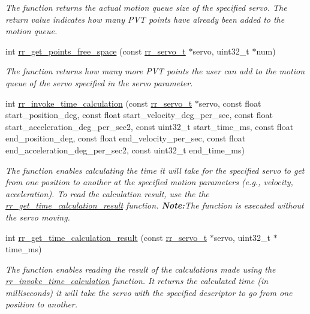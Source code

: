\begin{DoxyCompactItemize}
\begin{DoxyCompactList}\small\item\em The function returns the actual motion queue size of the specified servo. The return value indicates how many P\+VT points have already been added to the motion queue. \end{DoxyCompactList}\item 
int \hyperlink{group___servo__info_gaafd0d575c047ed269664fbc760a640c1}{rr\+\_\+get\+\_\+points\+\_\+free\+\_\+space} (const \hyperlink{structrr__servo__t}{rr\+\_\+servo\+\_\+t} $\ast$servo, uint32\+\_\+t $\ast$num)
\begin{DoxyCompactList}\small\item\em The function returns how many more P\+VT points the user can add to the motion queue of the servo specified in the \textquotesingle{}servo\textquotesingle{} parameter. \end{DoxyCompactList}\item 
int \hyperlink{group___servo__info_ga33c16ac8844acb025f57fd3e5d946f11}{rr\+\_\+invoke\+\_\+time\+\_\+calculation} (const \hyperlink{structrr__servo__t}{rr\+\_\+servo\+\_\+t} $\ast$servo, const float start\+\_\+position\+\_\+deg, const float start\+\_\+velocity\+\_\+deg\+\_\+per\+\_\+sec, const float start\+\_\+acceleration\+\_\+deg\+\_\+per\+\_\+sec2, const uint32\+\_\+t start\+\_\+time\+\_\+ms, const float end\+\_\+position\+\_\+deg, const float end\+\_\+velocity\+\_\+per\+\_\+sec, const float end\+\_\+acceleration\+\_\+deg\+\_\+per\+\_\+sec2, const uint32\+\_\+t end\+\_\+time\+\_\+ms)
\begin{DoxyCompactList}\small\item\em The function enables calculating the time it will take for the specified servo to get from one position to another at the specified motion parameters (e.\+g., velocity, acceleration). To read the calculation result, use the the \hyperlink{group___servo__info_ga0d01b53187b97dacd7611dacb37024d8}{rr\+\_\+get\+\_\+time\+\_\+calculation\+\_\+result} function. {\bfseries Note\+:}The function is executed without the servo moving.~\newline
 \end{DoxyCompactList}\item 
int \hyperlink{group___servo__info_ga0d01b53187b97dacd7611dacb37024d8}{rr\+\_\+get\+\_\+time\+\_\+calculation\+\_\+result} (const \hyperlink{structrr__servo__t}{rr\+\_\+servo\+\_\+t} $\ast$servo, uint32\+\_\+t $\ast$time\+\_\+ms)
\begin{DoxyCompactList}\small\item\em The function enables reading the result of the calculations made using the \hyperlink{group___servo__info_ga33c16ac8844acb025f57fd3e5d946f11}{rr\+\_\+invoke\+\_\+time\+\_\+calculation} function. It returns the calculated time (in milliseconds) it will take the servo with the specified descriptor to go from one position to another. \end{DoxyCompactList}\item 

\end{DoxyCompactItemize}
